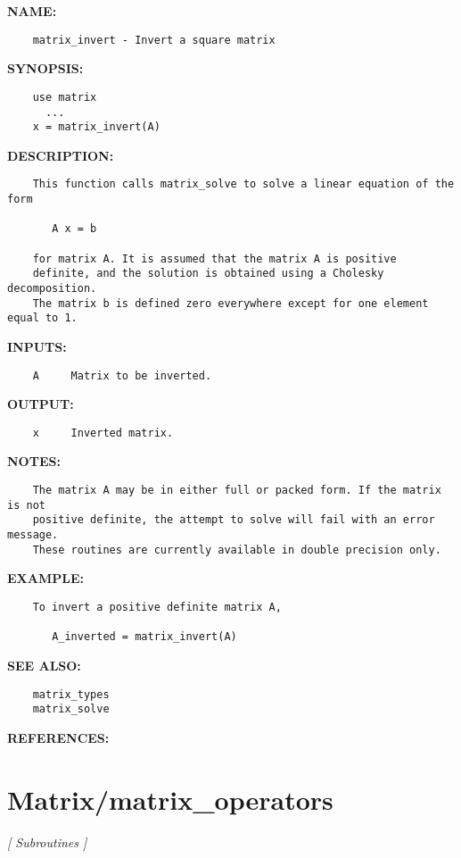 \label{ch:robo28}
\label{ch:Matrix_matrix_invert}
\textbf{NAME:}\hspace{0.08in}\begin{Verbatim}
    matrix_invert - Invert a square matrix 
\end{Verbatim}
\textbf{SYNOPSIS:}\hspace{0.08in}\begin{Verbatim}
    use matrix
      ...
    x = matrix_invert(A)
\end{Verbatim}
\textbf{DESCRIPTION:}\hspace{0.08in}\begin{Verbatim}
    This function calls matrix_solve to solve a linear equation of the form

       A x = b

    for matrix A. It is assumed that the matrix A is positive 
    definite, and the solution is obtained using a Cholesky decomposition. 
    The matrix b is defined zero everywhere except for one element equal to 1.
\end{Verbatim}
\textbf{INPUTS:}\hspace{0.08in}\begin{Verbatim}
    A     Matrix to be inverted.
\end{Verbatim}
\textbf{OUTPUT:}\hspace{0.08in}\begin{Verbatim}
    x     Inverted matrix.
\end{Verbatim}
\textbf{NOTES:}\hspace{0.08in}\begin{Verbatim}
    The matrix A may be in either full or packed form. If the matrix is not 
    positive definite, the attempt to solve will fail with an error message.
    These routines are currently available in double precision only.
\end{Verbatim}
\textbf{EXAMPLE:}\hspace{0.08in}\begin{Verbatim}
    To invert a positive definite matrix A,

       A_inverted = matrix_invert(A)
\end{Verbatim}
\textbf{SEE ALSO:}\hspace{0.08in}\begin{Verbatim}
    matrix_types
    matrix_solve
\end{Verbatim}
\textbf{REFERENCES:}\hspace{0.08in}\section{Matrix/matrix\_operators}
\textsl{[ Subroutines ]}

